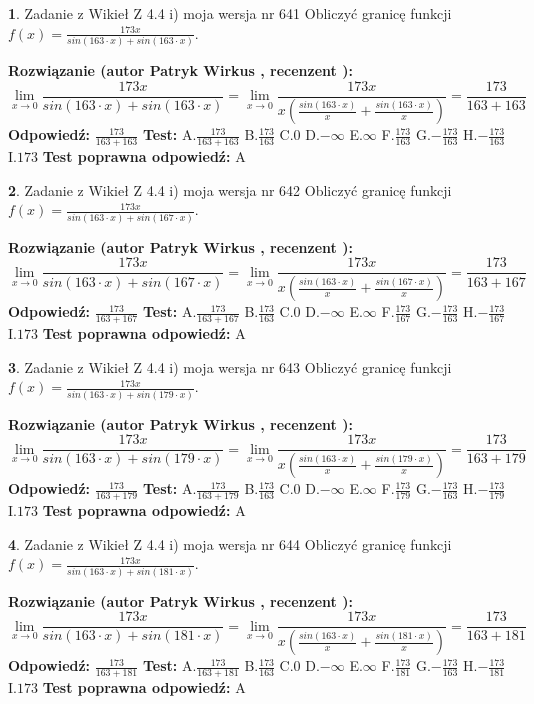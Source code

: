 \documentclass[12pt, a4paper]{article}
\theoremstyle{definition} %
\newtheorem{zad}{}
\newcommand{\zadStart}[1]{\begin{zad}#1\newline}
\newcommand{\zadStop}{\end{zad}}
\newcommand{\rozwStart}[2]{\noindent \textbf{Rozwiązanie (autor #1 , recenzent #2): }\newline}
\newcommand{\rozwStop}{\newline}
\newcommand{\odpStart}{\noindent \textbf{Odpowiedź:}\newline}
\newcommand{\odpStop}{\newline}
\newcommand{\testStart}{\noindent \textbf{Test:}\newline}
\newcommand{\testStop}{\newline}
\newcommand{\kluczStart}{\noindent \textbf{Test poprawna odpowiedź:}\newline}
\newcommand{\kluczStop}{\newline}
\begin{document}
\zadStart{Zadanie z Wikieł Z 4.4 i) moja wersja nr 641}
Obliczyć granicę funkcji $f(x)=\frac{173x}{sin(163\cdot x) +sin(163\cdot x)}$.
\zadStop
\rozwStart{Patryk Wirkus}{}
$$\lim\limits_{x\to 0}\frac{173x}{sin(163\cdot x) +sin(163\cdot x)}=\lim\limits_{x\to 0}\frac{173x}{x(\frac{sin(163\cdot x)}{x}+\frac{sin(163\cdot x)}{x})}=\frac{173}{163+163}$$
\rozwStop
\odpStart
$\frac{173}{163+163}$
\odpStop
\testStart
A.$\frac{173}{163+163}$
B.$\frac{173}{163}$
C.$0$
D.$-\infty$
E.$\infty$
F.$\frac{173}{163}$
G.$-\frac{173}{163}$
H.$-\frac{173}{163}$
I.$173$
\testStop
\kluczStart
A
\kluczStop



\zadStart{Zadanie z Wikieł Z 4.4 i) moja wersja nr 642}
Obliczyć granicę funkcji $f(x)=\frac{173x}{sin(163\cdot x) +sin(167\cdot x)}$.
\zadStop
\rozwStart{Patryk Wirkus}{}
$$\lim\limits_{x\to 0}\frac{173x}{sin(163\cdot x) +sin(167\cdot x)}=\lim\limits_{x\to 0}\frac{173x}{x(\frac{sin(163\cdot x)}{x}+\frac{sin(167\cdot x)}{x})}=\frac{173}{163+167}$$
\rozwStop
\odpStart
$\frac{173}{163+167}$
\odpStop
\testStart
A.$\frac{173}{163+167}$
B.$\frac{173}{163}$
C.$0$
D.$-\infty$
E.$\infty$
F.$\frac{173}{167}$
G.$-\frac{173}{163}$
H.$-\frac{173}{167}$
I.$173$
\testStop
\kluczStart
A
\kluczStop



\zadStart{Zadanie z Wikieł Z 4.4 i) moja wersja nr 643}
Obliczyć granicę funkcji $f(x)=\frac{173x}{sin(163\cdot x) +sin(179\cdot x)}$.
\zadStop
\rozwStart{Patryk Wirkus}{}
$$\lim\limits_{x\to 0}\frac{173x}{sin(163\cdot x) +sin(179\cdot x)}=\lim\limits_{x\to 0}\frac{173x}{x(\frac{sin(163\cdot x)}{x}+\frac{sin(179\cdot x)}{x})}=\frac{173}{163+179}$$
\rozwStop
\odpStart
$\frac{173}{163+179}$
\odpStop
\testStart
A.$\frac{173}{163+179}$
B.$\frac{173}{163}$
C.$0$
D.$-\infty$
E.$\infty$
F.$\frac{173}{179}$
G.$-\frac{173}{163}$
H.$-\frac{173}{179}$
I.$173$
\testStop
\kluczStart
A
\kluczStop



\zadStart{Zadanie z Wikieł Z 4.4 i) moja wersja nr 644}
Obliczyć granicę funkcji $f(x)=\frac{173x}{sin(163\cdot x) +sin(181\cdot x)}$.
\zadStop
\rozwStart{Patryk Wirkus}{}
$$\lim\limits_{x\to 0}\frac{173x}{sin(163\cdot x) +sin(181\cdot x)}=\lim\limits_{x\to 0}\frac{173x}{x(\frac{sin(163\cdot x)}{x}+\frac{sin(181\cdot x)}{x})}=\frac{173}{163+181}$$
\rozwStop
\odpStart
$\frac{173}{163+181}$
\odpStop
\testStart
A.$\frac{173}{163+181}$
B.$\frac{173}{163}$
C.$0$
D.$-\infty$
E.$\infty$
F.$\frac{173}{181}$
G.$-\frac{173}{163}$
H.$-\frac{173}{181}$
I.$173$
\testStop
\kluczStart
A
\kluczStop
\end{document}
